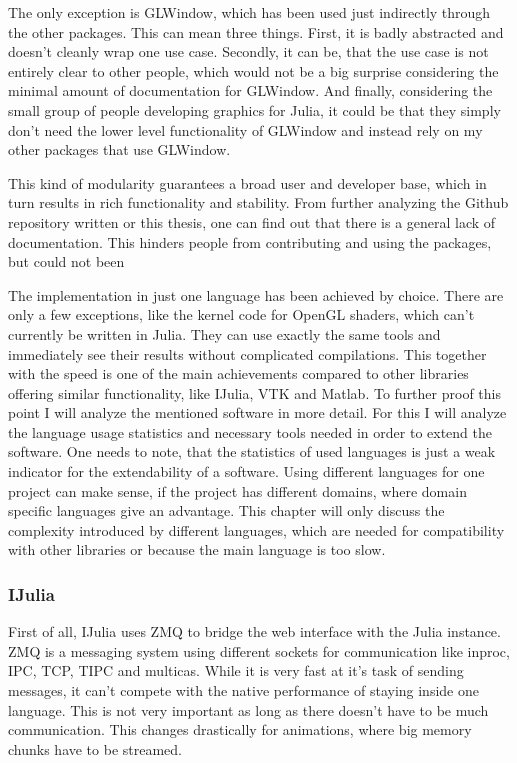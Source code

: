 The only exception is GLWindow, which has been used just indirectly through the other packages. 
This can mean three things.
First, it is badly abstracted and doesn't cleanly wrap one use case.
Secondly, it can be, that the use case is not entirely clear to other people, which would not be a big surprise considering the minimal amount of documentation for GLWindow.
And finally, considering the small group of people developing graphics for Julia, it could be that they simply don't need the lower level functionality of GLWindow and instead rely on my other packages that use GLWindow.

This kind of modularity guarantees a broad user and developer base, which in turn results in rich functionality and stability.
From further analyzing the Github repository written or this thesis, one can find out that there is a general lack of documentation.
This hinders people from contributing and using the packages, but could not been 

The implementation in just one language has been achieved by choice. There are only a few exceptions, like the kernel code for OpenGL shaders, which can't currently be written in Julia. 
They can use exactly the same tools and immediately see their results without complicated compilations.
This together with the speed is one of the main achievements compared to other libraries offering similar functionality, like IJulia, VTK and Matlab.
To further proof this point I will analyze the mentioned software in more detail.
For this I will analyze the language usage statistics and necessary tools needed in order to extend the software.
One needs to note, that the statistics of used languages is just a weak indicator for the extendability of a software.
Using different languages for one project can make sense, if the project has different domains, where domain specific languages give an advantage.
This chapter will only discuss the complexity introduced by different languages, which are needed for compatibility with other libraries or because the main language is too slow.

\subsubsection{IJulia}
First of all, IJulia uses ZMQ to bridge the web interface with the Julia instance.
ZMQ is a messaging system using different sockets for communication like inproc, IPC, TCP, TIPC and multicas.
While it is very fast at it's task of sending messages, it can't compete with the native performance of staying inside one language.
This is not very important as long as there doesn't have to be much communication. This changes drastically for animations, where big memory chunks have to be streamed.

